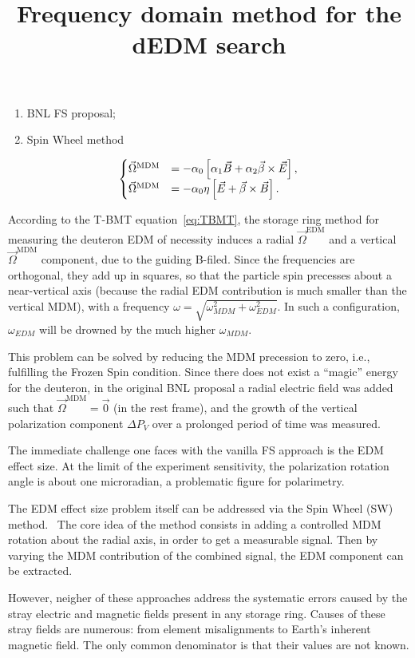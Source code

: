 \documentclass{article}
\newcommand{\W}{\Omega}
\newcommand{\w}{\omega}
\newcommand{\MDM}{^\mathrm{MDM}}
\newcommand{\EDM}{^\mathrm{EDM}}
\begin{document}
\title{Frequency domain method for the dEDM search}

\begin{enumerate}
\item BNL FS proposal;
\item Spin Wheel method
\end{enumerate}

\begin{equation}\label{eq:TBMT}
  \begin{cases}
    \vec\W\MDM &= -\alpha_0\bkt*{\alpha_1\vec B + \alpha_2\vec\beta\times\vec E}, \\
    \vec\W\MDM &= -\alpha_0\eta\bkt*{\vec E + \vec\beta\times\vec B}.
  \end{cases}
\end{equation}

According to the T-BMT equation~\eqref{eq:TBMT}, the storage ring method for measuring the deuteron EDM of necessity induces a radial $\vec\W\EDM$ and a vertical $\vec\W\MDM$ component, due to the guiding B-filed. Since the frequencies are orthogonal, they add up in squares, so that the particle spin precesses about a near-vertical axis (because the radial EDM contribution is much smaller than the vertical MDM), with a frequency $\w  = \sqrt{\w_{MDM}^2 + \w_{EDM}^2}$. In such a configuration, $\w_{EDM}$ will be drowned by the much higher $\w_{MDM}$. 


This problem can be solved by reducing the MDM precession to zero, i.e., fulfilling the Frozen Spin condition. Since there does not exist a ``magic'' energy for the deuteron, in the original BNL proposal a radial electric field was added such that $\vec\W\MDM = \vec 0$ (in the rest frame), and the growth of the vertical polarization component $\Delta P_V$ over a prolonged period of time was measured.~\cite{BNL_proposal}

The immediate challenge one faces with the vanilla FS approach is the EDM effect size. At the limit of the experiment sensitivity, the polarization rotation angle is about one microradian, a problematic figure for polarimetry.

The EDM effect size problem itself can be addressed via the Spin Wheel (SW) method.~\cite{Mane:SpinWheel} The core idea of the method consists in adding a controlled MDM rotation about the radial axis, in order to get a measurable signal. Then by varying the MDM contribution of the combined signal, the EDM component can be extracted.

However, neigher of these approaches address the systematic errors caused by the stray electric and magnetic fields present in any storage ring. Causes of these stray fields are numerous: from element misalignments to Earth's inherent magnetic field. The only common denominator is that their values are not known.
\end{document}
